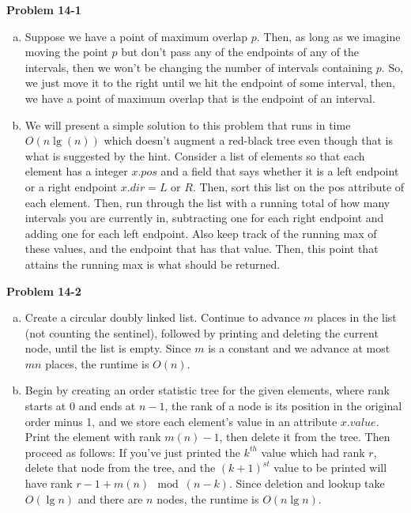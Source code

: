 \documentclass{article}
\begin{document}
\noindent\textbf{ Problem 14-1} \\

\begin{enumerate}[a.]
\item 
Suppose we have a point of maximum overlap $p$. Then, as long as we imagine moving the point $p$ but don't pass any of the endpoints of any of the intervals, then we won't be changing the number of intervals containing $p$. So, we just move it to the right until we hit the endpoint of some interval, then, we have a point of maximum overlap that is the endpoint of an interval.

\item
We will present a simple solution to this problem that runs in time $O(n\lg(n))$ which doesn't augment a red-black tree even though that is what is suggested by the hint. Consider a list of elements so that each element has a integer $x.pos$ and a field that says whether it is a left endpoint or a right endpoint $x.dir = L$ or $R$. Then, sort this list on the pos attribute of each element. Then, run through the list with a running total of how many intervals you are currently in, subtracting one for each right endpoint and adding one for each left endpoint. Also keep track of the running max of these values, and the endpoint that has that value. Then, this point that attains the running max is what should be returned.

\end{enumerate}

\noindent\textbf{Problem 14-2}\\
\begin{enumerate}[a.]
\item Create a circular doubly linked list.  Continue to advance $m$ places in the list (not  counting the sentinel), followed by printing and deleting the current node, until the list is empty. Since $m$ is a constant and we advance at most $mn$ places, the runtime is $O(n)$.\\

\item Begin by creating an order statistic tree for the given elements, where rank starts at 0 and ends at $n-1$, the rank of a node is its position in the original order minus 1, and we store each element's value in an attribute $x.value$.  Print the element with rank $m(n) - 1$, then delete it from the tree.  Then proceed as follows:  If you've just printed the $k^{th}$ value which had rank $r$, delete that node from the tree, and the $(k+1)^{st}$ value to be printed will have rank $r - 1 + m(n) \mod (n-k)$.  Since deletion and lookup take $O(\lg n)$ and there are $n$ nodes, the runtime is $O(n\lg n)$.
\end{enumerate}
\end{document}
